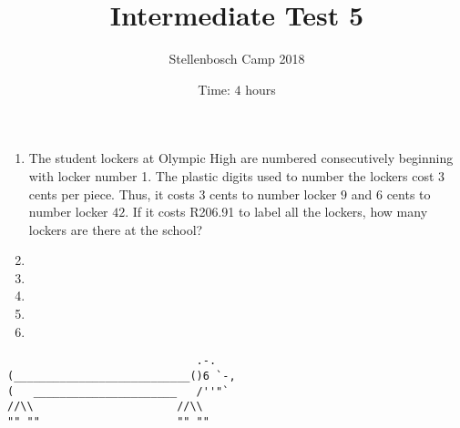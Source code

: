 \documentclass{article}
\title{Intermediate Test 5}
\author{Stellenbosch Camp 2018}
\date{Time: $4$ hours}
\begin{document}
 \maketitle

\begin{enumerate}[1.]

\item %
The student lockers at Olympic High are numbered consecutively beginning with locker number 1. The plastic digits used to number the lockers cost $3$ cents per piece. Thus, it costs $3$ cents to number locker $9$ and $6$ cents to number locker $42$. If it costs R206.91 to label all the lockers, how many lockers are there at the school?


\vspace{6pt}
\item %


\vspace{6pt}
\item %


\vspace{6pt}
\item %


\vspace{6pt}
\item %


\vspace{6pt}
\item %


\end{enumerate}


\vfill
\centering
\begin{BVerbatim}
                             .-.
(___________________________()6 `-,
(   ______________________   /''"`
//\\                      //\\
"" ""                     "" ""
\end{BVerbatim}
\end{document}

